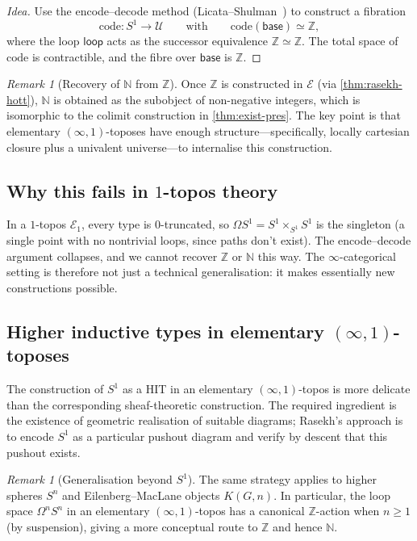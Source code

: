 \documentclass[12pt]{article}
\theoremstyle{definition}
\theoremstyle{remark}
\newtheorem{remark}[theorem]{Remark}
\newcommand{\N}{\mathbb{N}}
\newcommand{\Z}{\mathbb{Z}}
\newcommand{\eqv}{\simeq}
\newcommand{\U}{\mathcal{U}}
\newcommand{\looppath}{\mathsf{loop}}
\newcommand{\base}{\mathsf{base}}
\newcommand{\Sone}{S^{1}}
\begin{document}
\begin{proof}[Idea]
Use the encode--decode method (Licata--Shulman~\cite{LicataShulman}) to construct a fibration
\[
\mathrm{code}\colon \Sone\to \U \qquad\text{with}\qquad \mathrm{code}(\base)\eqv\Z,
\]
where the loop $\looppath$ acts as the successor equivalence $\Z\eqv\Z$. The total space of $\mathrm{code}$ is contractible, and the fibre over $\base$ is $\Z$.
\end{proof}

\begin{remark}[Recovery of $\N$ from $\Z$]
Once $\Z$ is constructed in $\mathcal{E}$ (via \cref{thm:rasekh-hott}), $\N$ is obtained as the subobject of non-negative integers, which is isomorphic to the colimit construction in \cref{thm:exist-pres}. The key point is that elementary $(\infty,1)$-toposes have enough structure---specifically, locally cartesian closure plus a univalent universe---to internalise this construction.
\end{remark}

\subsection{Why this fails in \texorpdfstring{$1$}{1}-topos theory}

In a $1$-topos $\mathcal{E}_{1}$, every type is $0$-truncated, so $\Omega\Sone = \Sone\times_{\Sone}\Sone$ is the singleton (a single point with no nontrivial loops, since paths don't exist). The encode--decode argument collapses, and we cannot recover $\Z$ or $\N$ this way. The $\infty$-categorical setting is therefore not just a technical generalisation: it makes essentially new constructions possible.

\subsection{Higher inductive types in elementary \texorpdfstring{$(\infty,1)$}{(infinity,1)}-toposes}

The construction of $\Sone$ as a HIT in an elementary $(\infty,1)$-topos is more delicate than the corresponding sheaf-theoretic construction. The required ingredient is the existence of geometric realisation of suitable diagrams; Rasekh's approach is to encode $\Sone$ as a particular pushout diagram and verify by descent that this pushout exists.

\begin{remark}[Generalisation beyond $\Sone$]
The same strategy applies to higher spheres $S^{n}$ and Eilenberg--MacLane objects $K(G,n)$. In particular, the loop space $\Omega^{n}S^{n}$ in an elementary $(\infty,1)$-topos has a canonical $\Z$-action when $n\geq 1$ (by suspension), giving a more conceptual route to $\Z$ and hence $\N$.
\end{remark}
\end{document}
